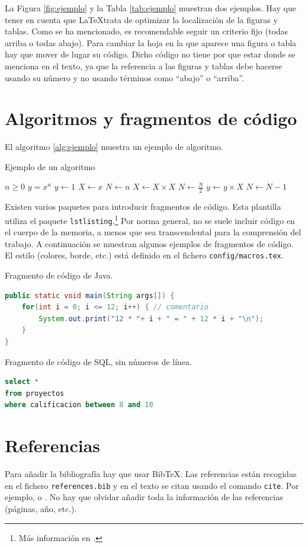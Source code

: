 La Figura \ref{fig:ejemplo} y la Tabla \ref{tab:ejemplo} muestran dos ejemplos. Hay que tener en cuenta que \LaTeX trata de optimizar la localización de la figuras y tablas. Como se ha mencionado, es recomendable seguir un criterio fijo (todas arriba o todas abajo). Para cambiar la hoja en la que aparece una figura o tabla hay que mover de lugar su código. Dicho código no tiene por que estar donde se menciona en el texto, ya que la referencia a las figuras y tablas debe hacerse usando su número y no usando términos como ``abajo'' o ``arriba''.

\section{Algoritmos y fragmentos de código}

El algoritmo \ref{alg:ejemplo} muestra un ejemplo de algoritmo.

\clearpage

\begin{algorithm}
\caption{Ejemplo de un algoritmo}\label{alg:ejemplo}
\begin{algorithmic}
\Require $n \geq 0$
\Ensure $y = x^n$
\State $y \gets 1$
\State $X \gets x$
\State $N \gets n$
    \State $X \gets X \times X$
    \State $N \gets \frac{N}{2}$
    \State $y \gets y \times X$
    \State $N \gets N - 1$
\EndIf
\EndWhile
\end{algorithmic}
\end{algorithm}

Existen varios paquetes para introducir fragmentos de código. Esta plantilla utiliza el paquete \texttt{lstlisting}.\footnote{Más información en \cite{lstlistingdoc}.} Por norma general, no se suele incluir código en el cuerpo de la memoria, a menos que sea transcendental para la comprensión del trabajo. A continuación se muestran algunos ejemplos de fragmentos de código. El estilo (colores, borde, etc.) está definido en el fichero \texttt{config/macros.tex}.

Fragmento de código de Java.
\begin{lstlisting}[language=Java]
public static void main(String args[]) {
    for(int i = 0; i <= 12; i++) { // comentario
        System.out.print("12 * "+ i + " = " + 12 * i + "\n");
    }
}
\end{lstlisting}

Fragmento de código de SQL, sin números de línea.
\begin{lstlisting}[language=SQL,numbers=none]
select *
from proyectos
where calificacion between 8 and 10
\end{lstlisting}


\section{Referencias}

Para añadir la bibliografía hay que usar BibTeX. Las referencias están recogidas en el fichero \texttt{references.bib} y en el texto se citan usando el comando \texttt{cite}. Por ejemplo, \cite{Shahbaba2011} o \cite{Efron1994, Rmanual, Subramanian2005gene}. No hay que olvidar añadir toda la información de las referencias (páginas, año, etc.). 